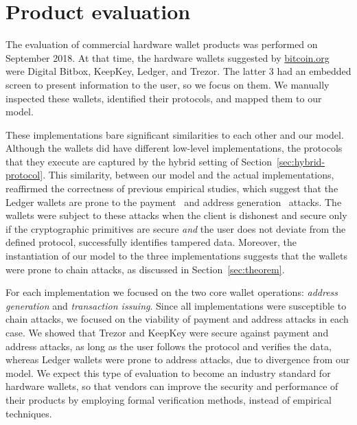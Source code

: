 \section{Product evaluation}\label{sec:evaluation}

The evaluation of commercial hardware wallet products was performed on September 2018.
At that time, the hardware wallets suggested by
\href{https://bitcoin.org/}{bitcoin.org} were Digital Bitbox, KeepKey, Ledger,
and Trezor. The latter $3$ had an embedded screen to present information to the
user, so we focus on them. We manually inspected these wallets, identified
their protocols, and mapped them to our model.

These implementations bare significant similarities to
each other and our model. Although the wallets did have different low-level
implementations, the protocols that they execute are captured by the hybrid
setting of Section~\ref{sec:hybrid-protocol}. This similarity, between our
model and the actual implementations, reaffirmed the correctness of previous
empirical studies, which suggest that the Ledger wallets are prone to the
payment~\cite{ISC:GkaAraKia17} and address generation~\cite{receiveAttack}
attacks. The wallets were subject to these attacks when the client is dishonest
and secure only if the cryptographic primitives are secure \emph{and} the user
does not deviate from the defined protocol, \ie successfully identifies
tampered data. Moreover, the instantiation of our model to the three
implementations suggests that the wallets were prone to chain attacks, as
discussed in Section~\ref{sec:theorem}.

For each implementation we focused on the two core wallet operations:
\emph{address generation} and \emph{transaction issuing}. Since all
implementations were susceptible to chain attacks, we focused on the viability
of payment and address attacks in each case. We showed that Trezor and KeepKey
were secure against payment and address attacks, as long as the user follows
the protocol and verifies the data, whereas Ledger wallets were prone to
address attacks, due to divergence from our model. We expect this type of
evaluation to become an industry standard for hardware wallets, so that vendors
can improve the security and performance of their products by employing formal
verification methods, instead of empirical techniques.

